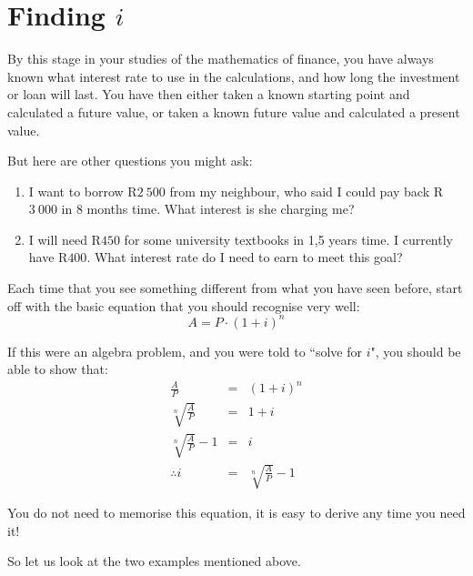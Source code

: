 \section{Finding $i$}
\label{sec:m:f11:interest}
By this stage in your studies of the mathematics of finance, you have always known what interest rate to use in the calculations, and how long the investment or loan will last. You have then either taken a known starting point and calculated a future value, or taken a known future value and calculated a present value.

But here are other questions you might ask:
\begin{enumerate}
\item{I want to borrow R$2~500$ from my neighbour, who said I could pay back R$3~000$ in 8 months time. What interest is she charging me?}
\item{I will need R$450$ for some university textbooks in 1,5 years time. I currently have R$400$. What interest rate do I need to earn to meet this goal?}
\end{enumerate}

Each time that you see something different from what you have seen before, start off with the basic equation that you should recognise very well:
\begin{equation*}
A = P \cdot (1+i)^n
\end{equation*}

If this were an algebra problem, and you were told to ``solve for $i$", you should be able to show that:
\begin{eqnarray*}
\frac{A}{P} &=& (1 + i)^n\\
\sqrt[n]{\frac{A}{P}} &=& 1 + i\\
\sqrt[n]{\frac{A}{P}} -1 &=& i\\
\therefore i &=& \sqrt[n]{\frac{A}{P}} -1 
\end{eqnarray*}

You do not need to memorise this equation, it is easy to derive any time you need it!

So let us look at the two examples mentioned above.

